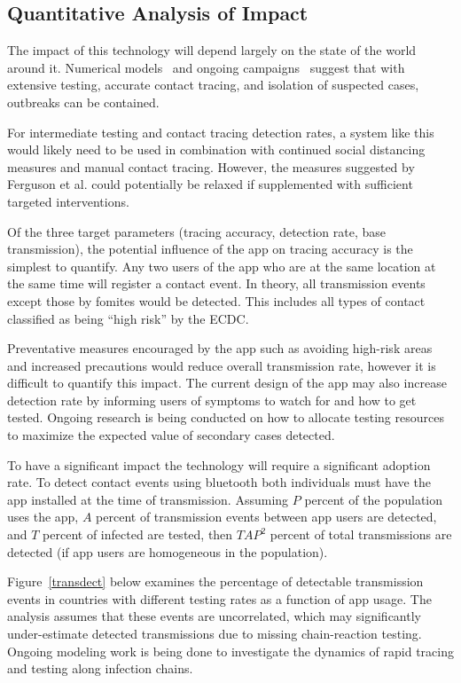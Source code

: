 \documentclass[11pt]{article}
\begin{document}
\subsection{Quantitative Analysis of Impact}


The impact of this technology will depend largely on the state of the world around it. Numerical models~\cite{Ferrettieabb6936} and ongoing campaigns~\cite{normile_2020} suggest that with extensive testing, accurate contact tracing, and isolation of suspected cases, outbreaks can be contained. 

For intermediate testing and contact tracing detection rates, a system like this would likely need to be used in combination with continued social distancing measures and manual contact tracing. However, the measures suggested by Ferguson et al. could potentially be relaxed if supplemented with sufficient targeted interventions.   

Of the three target parameters (tracing accuracy, detection rate, base transmission), the potential influence of the app on tracing accuracy is the simplest to quantify. Any two users of the app who are at the same location at the same time will register a contact event. In theory,  all transmission events except those by fomites would be detected. This includes all types of contact classified as being “high risk” by the ECDC. 

Preventative measures encouraged by the app such as avoiding high-risk areas and increased precautions would reduce overall transmission rate, however it is difficult to quantify this impact. The current design of the app may also increase detection rate by informing users of symptoms to watch for and how to get tested. Ongoing research is being conducted on how to allocate testing resources to maximize the expected value of secondary cases detected. 

To have a significant impact the technology will require a significant adoption rate. To detect contact events using bluetooth both individuals must have the app installed at the time of transmission. Assuming $P$ percent of the population uses the app, $A$  percent of transmission events between app users are detected, and $T$ percent of infected are tested, then $TAP^2$ percent of total transmissions are detected (if app users are homogeneous in the population). 

Figure~\ref{transdect} below examines the percentage of detectable transmission events in countries with different testing rates as a function of app usage. The analysis assumes that these events are uncorrelated, which may significantly under-estimate detected transmissions due to missing chain-reaction testing. Ongoing modeling work is being done to investigate the dynamics of rapid tracing and testing along infection chains.
\end{document}
